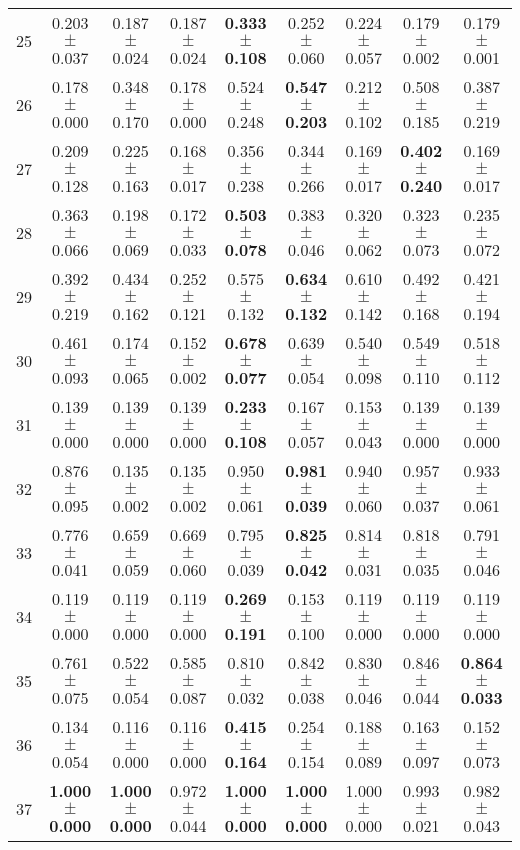 \begin{table}[!ht]
{\begin{tabular}{r c c c c c c c c}
25 & 0.203 $\pm$ 0.037 & 0.187 $\pm$ 0.024 & 0.187 $\pm$ 0.024 & \textbf{0.333 $\pm$ 0.108} & 0.252 $\pm$ 0.060 & 0.224 $\pm$ 0.057 & 0.179 $\pm$ 0.002 & 0.179 $\pm$ 0.001 \\
26 & 0.178 $\pm$ 0.000 & 0.348 $\pm$ 0.170 & 0.178 $\pm$ 0.000 & 0.524 $\pm$ 0.248 & \textbf{0.547 $\pm$ 0.203} & 0.212 $\pm$ 0.102 & 0.508 $\pm$ 0.185 & 0.387 $\pm$ 0.219 \\
27 & 0.209 $\pm$ 0.128 & 0.225 $\pm$ 0.163 & 0.168 $\pm$ 0.017 & 0.356 $\pm$ 0.238 & 0.344 $\pm$ 0.266 & 0.169 $\pm$ 0.017 & \textbf{0.402 $\pm$ 0.240} & 0.169 $\pm$ 0.017 \\
28 & 0.363 $\pm$ 0.066 & 0.198 $\pm$ 0.069 & 0.172 $\pm$ 0.033 & \textbf{0.503 $\pm$ 0.078} & 0.383 $\pm$ 0.046 & 0.320 $\pm$ 0.062 & 0.323 $\pm$ 0.073 & 0.235 $\pm$ 0.072 \\
29 & 0.392 $\pm$ 0.219 & 0.434 $\pm$ 0.162 & 0.252 $\pm$ 0.121 & 0.575 $\pm$ 0.132 & \textbf{0.634 $\pm$ 0.132} & 0.610 $\pm$ 0.142 & 0.492 $\pm$ 0.168 & 0.421 $\pm$ 0.194 \\
30 & 0.461 $\pm$ 0.093 & 0.174 $\pm$ 0.065 & 0.152 $\pm$ 0.002 & \textbf{0.678 $\pm$ 0.077} & 0.639 $\pm$ 0.054 & 0.540 $\pm$ 0.098 & 0.549 $\pm$ 0.110 & 0.518 $\pm$ 0.112 \\
31 & 0.139 $\pm$ 0.000 & 0.139 $\pm$ 0.000 & 0.139 $\pm$ 0.000 & \textbf{0.233 $\pm$ 0.108} & 0.167 $\pm$ 0.057 & 0.153 $\pm$ 0.043 & 0.139 $\pm$ 0.000 & 0.139 $\pm$ 0.000 \\
32 & 0.876 $\pm$ 0.095 & 0.135 $\pm$ 0.002 & 0.135 $\pm$ 0.002 & 0.950 $\pm$ 0.061 & \textbf{0.981 $\pm$ 0.039} & 0.940 $\pm$ 0.060 & 0.957 $\pm$ 0.037 & 0.933 $\pm$ 0.061 \\
33 & 0.776 $\pm$ 0.041 & 0.659 $\pm$ 0.059 & 0.669 $\pm$ 0.060 & 0.795 $\pm$ 0.039 & \textbf{0.825 $\pm$ 0.042} & 0.814 $\pm$ 0.031 & 0.818 $\pm$ 0.035 & 0.791 $\pm$ 0.046 \\
34 & 0.119 $\pm$ 0.000 & 0.119 $\pm$ 0.000 & 0.119 $\pm$ 0.000 & \textbf{0.269 $\pm$ 0.191} & 0.153 $\pm$ 0.100 & 0.119 $\pm$ 0.000 & 0.119 $\pm$ 0.000 & 0.119 $\pm$ 0.000 \\
35 & 0.761 $\pm$ 0.075 & 0.522 $\pm$ 0.054 & 0.585 $\pm$ 0.087 & 0.810 $\pm$ 0.032 & 0.842 $\pm$ 0.038 & 0.830 $\pm$ 0.046 & 0.846 $\pm$ 0.044 & \textbf{0.864 $\pm$ 0.033} \\
36 & 0.134 $\pm$ 0.054 & 0.116 $\pm$ 0.000 & 0.116 $\pm$ 0.000 & \textbf{0.415 $\pm$ 0.164} & 0.254 $\pm$ 0.154 & 0.188 $\pm$ 0.089 & 0.163 $\pm$ 0.097 & 0.152 $\pm$ 0.073 \\
37 & \textbf{1.000 $\pm$ 0.000} & \textbf{1.000 $\pm$ 0.000} & 0.972 $\pm$ 0.044 & \textbf{1.000 $\pm$ 0.000} & \textbf{1.000 $\pm$ 0.000} & 1.000 $\pm$ 0.000 & 0.993 $\pm$ 0.021 & 0.982 $\pm$ 0.043 \\

\end{tabular}}
\end{table}
